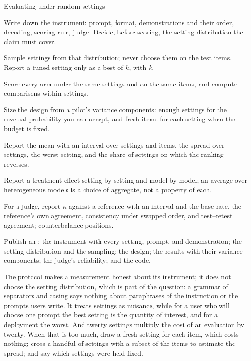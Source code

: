 \begin{refsection}
\begin{protocol}{Evaluating under random settings}\label{prot:instruments:evaluate}
\item Write down the instrument: prompt, format, demonstrations and their order, decoding, scoring rule, judge. Decide, before scoring, the setting distribution the claim must cover.
\item Sample settings from that distribution; never choose them on the test items. Report a tuned setting only as a best of $k$, with $k$.
\item Score every arm under the same settings and on the same items, and compute comparisons within settings.
\item Size the design from a pilot's variance components: enough settings for the reversal probability you can accept, and fresh items for each setting when the budget is fixed.
\item Report the mean with an interval over settings and items, the spread over settings, the worst setting, and the share of settings on which the ranking reverses.
\item Report a treatment effect setting by setting and model by model; an average over heterogeneous models is a choice of aggregate, not a property of each.
\item For a judge, report $\kappa$ against a reference with an interval and the base rate, the reference's own agreement, consistency under swapped order, and test--retest agreement; counterbalance positions.
\item Publish an : the instrument with every setting, prompt, and demonstration; the setting distribution and the sampling; the design; the results with their variance components; the judge's reliability; and the code.
\end{protocol}

The protocol makes a measurement honest about its instrument; it does not choose the setting distribution, which is part of the question: a grammar of separators and casing says nothing about paraphrases of the instruction or the prompts users write. It treats settings as nuisance, while for a user who will choose one prompt the best setting is the quantity of interest, and for a deployment the worst. And twenty settings multiply the cost of an evaluation by twenty. When that is too much, draw a fresh setting for each item, which costs nothing; cross a handful of settings with a subset of the items to estimate the spread; and say which settings were held fixed.


\end{refsection}
